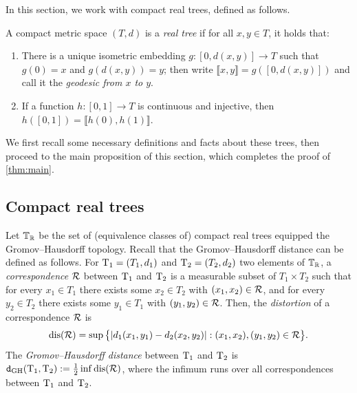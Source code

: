 \documentclass[11pt,reqno]{amsart}
\newcommand{\dGH}{\mathtt{d}_{\mathrm{GH}}}
\begin{document}
In this section, we work with compact real trees, defined as follows.
\begin{defn}
\label{real-tree_def}
A compact metric space $(T,d)$ is a \emph{real tree} if for all $x,y\in T$, it holds that:
\begin{enumerate}
    \item[(a)] There is a unique isometric embedding $g:[0,d(x,y)]\to T$ such that $g(0)=x$ and $g(d(x,y))=y$; then write $\llbracket x,y\rrbracket=g([0,d(x,y)])$ and call it the \emph{geodesic from $x$ to $y$}.
    \item[(b)] If a function $h:[0,1]\to T$ is continuous and injective, then $h([0,1])=\llbracket h(0),h(1)\rrbracket$.
\end{enumerate}
\end{defn}

We first recall some necessary definitions and facts about these trees, then proceed to the main proposition of this section, which completes the proof of \cref{thm:main}.


\subsection{Compact real trees}\label{sec:compact_real_tree}
Let $\mathbb{T}_{\mathbb{R}}$ be the set of (equivalence classes of) compact real trees equipped the Gromov--Hausdorff topology. Recall that the Gromov--Hausdorff distance can be defined as follows. For $\mathrm{T}_1 = (T_1, d_1)$ and $ \mathrm{T}_2 = (T_2, d_2)$ two elements of $\mathbb{T}_{\mathbb{R}}$, a \emph{correspondence} ${\mathcal R}$ between $\mathrm{T}_1$ and $\mathrm{T}_2$ is a measurable subset of $T_1 \times T_2$ such that for every $x_1 \in T_1$ there exists some $x_2 \in T_2$ with $(x_1, x_2) \in {\mathcal R}$, and for every $y_2 \in T_2$ there exists some $y_1 \in T_1$ with $(y_1, y_2) \in {\mathcal R}$. Then, the \emph{distortion} of a correspondence ${\mathcal R}$ is 
\begin{equation}\label{def-distortion}
    \mathrm{dis}({\mathcal R}) = \sup\big\{ |d_1(x_1, y_1) - d_2(x_2, y_2)| : (x_1, x_2), (y_1, y_2) \in {\mathcal R} \big\}.
\end{equation}
The \emph{Gromov--Hausdorff distance} between $\mathrm{T}_1$ and $\mathrm{T}_2$ is $\dGH(\rT_1, \rT_2) := \frac{1}{2}\inf \mathrm{dis}(\cR)$, where the infimum runs over all correspondences between $\mathrm{T}_1$ and $\mathrm{T}_2$.
\smallskip 
\end{document}
